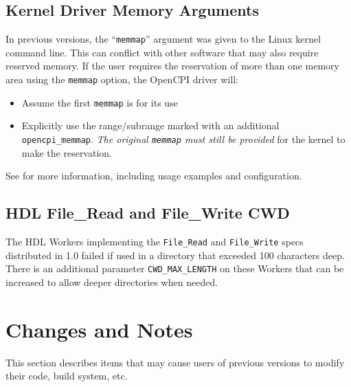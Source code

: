 \subsection{Kernel Driver Memory Arguments}
In previous versions, the ``\texttt{memmap}'' argument was given to the Linux kernel command line. This can conflict with other software that may also require reserved memory. If the user requires the reservation of more than one memory area using the \texttt{memmap} option, the OpenCPI driver will:
\begin{itemize}
\setlength\itemsep{0pt} %
\item Assume the first \texttt{memmap} is for its use
\item Explicitly use the range/subrange marked with an additional \texttt{opencpi\_memmap}. \textit{The original \texttt{memmap} must still be provided} for the kernel to make the reservation.
\end{itemize}
See  for more information, including usage examples and configuration.

\subsection{HDL File\_Read and File\_Write CWD}
\label{sec:11_cwd}
The HDL Workers implementing the \texttt{File\_Read} and \texttt{File\_Write} specs distributed in 1.0 failed if used in a directory that exceeded 100 characters deep. There is an additional parameter \texttt{CWD\_MAX\_LENGTH} on these Workers that can be increased to allow deeper directories when needed.

\section{Changes and Notes}
This section describes items that may cause users of previous versions to modify their code, build system, etc.


